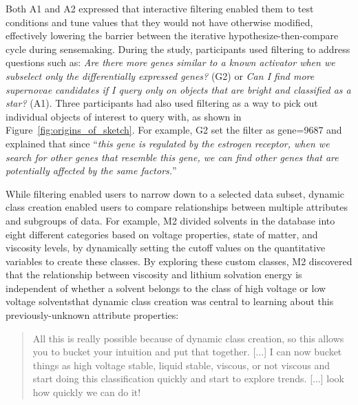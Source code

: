 \par Both A1 and A2 expressed that
interactive filtering enabled
them to test conditions and tune values
that they would not have otherwise modified,
effectively lowering the barrier between
the iterative hypothesize-then-compare cycle during sensemaking.
During the study, participants used filtering
to address questions such as:
\textit{Are there more genes similar
to a known activator when we subselect
only the differentially expressed genes?} (G2) or \textit{Can I find more supernovae candidates if I query only on objects that are bright and classified as a star?} (A1). Three participants had also used filtering as a way to pick out individual objects of interest to query with, as shown in Figure~\ref{fig:origins_of_sketch}. For example, G2 set the filter as gene=9687 and explained that since ``\textit{this gene is regulated by the estrogen receptor, when we search for other genes that resemble this gene, we can find other genes that are potentially affected by the same factors.}''
\par While filtering enabled users to
narrow down to a selected data subset,
dynamic class creation enabled users to compare
relationships between multiple attributes and subgroups of data.
For example, M2 divided solvents in the database
into eight different categories based on voltage properties,
state of matter, and viscosity levels,
by dynamically setting the cutoff values
on the quantitative variables to create these classes.
By exploring these custom classes, M2 discovered that the relationship between viscosity and lithium solvation energy is independent of whether a solvent belongs to the class of high voltage or low voltage solventsthat dynamic class creation was central to learning about this previously-unknown attribute properties:
\begin{quote}
All this is really possible because of dynamic class creation, so this allows you to bucket your intuition and put that together. [...] I can now bucket things as high voltage stable, liquid stable, viscous, or not viscous and start doing this classification quickly and start to explore trends. [...] look how quickly we can do it!%
\end{quote}
